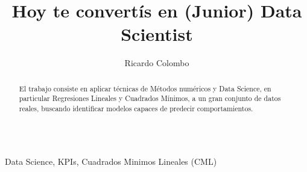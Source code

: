 \documentclass{endm}
\begin{document}
\begin{verbatim}\end{verbatim}\vspace{2.5cm}

\begin{frontmatter}

\title{Hoy te convert\'is en (Junior) Data Scientist}

\author{Ricardo Colombo}

\address{Departamento de Computaci\'on\\ Universidad de Buenos Aires\\ C.A.B.A, Argentina}



\begin{abstract}
El trabajo consiste en aplicar t\'ecnicas de M\'etodos num\'ericos y 
Data Science, en particular Regresiones Lineales y Cuadrados M\'inimos, 
a un gran conjunto de datos reales, buscando identificar modelos 
capaces de predecir comportamientos.
\end{abstract}

\begin{keyword}
Data Science, KPIs, Cuadrados Minimos Lineales (CML)
\end{keyword}

\end{frontmatter}
\end{document}
